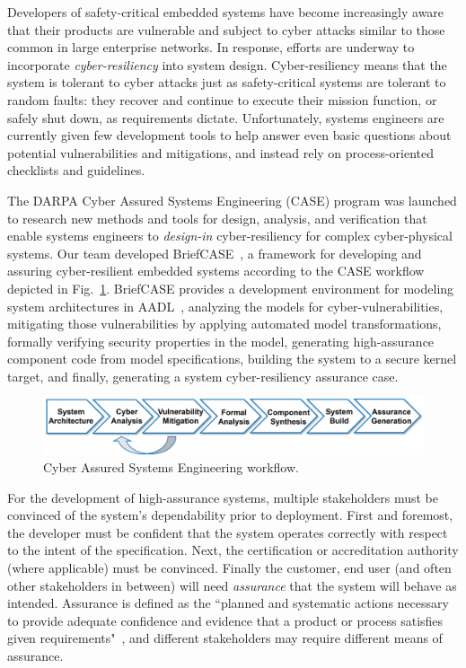 
Developers of safety-critical embedded systems have become increasingly aware that their products are vulnerable and subject to cyber attacks similar to those common in large enterprise networks.  In response, efforts are underway to incorporate \textit{cyber-resiliency} into system design.  Cyber-resiliency means that the system is tolerant to cyber attacks just as safety-critical systems are tolerant to random faults: they recover and continue to execute their mission function, or safely shut down, as requirements dictate.  Unfortunately, systems engineers are currently given few development tools to help answer even basic questions about potential vulnerabilities and mitigations, and instead rely on process-oriented checklists and guidelines.

The DARPA Cyber Assured Systems Engineering (CASE) program was launched to research new methods and tools for design, analysis, and verification that enable systems engineers to \textit{design-in} cyber-resiliency for complex cyber-physical systems. 
%
Our team developed BriefCASE~\cite{case-at-scale}, a framework for developing and assuring cyber-resilient embedded systems according to the CASE workflow depicted in Fig.~\ref{fig:workflow}. BriefCASE provides a development environment for modeling system architectures in AADL~\cite{feiler-aadl}, analyzing the models for cyber-vulnerabilities, mitigating those vulnerabilities by applying automated model transformations, formally verifying security properties in the model, generating high-assurance component code from model specifications, building the system to a secure kernel target, and finally, generating a system cyber-resiliency assurance case.  

\begin{figure}[h] 
	\centering 
	\includegraphics[width=\columnwidth]{figs/workflow.jpg}
	\caption{Cyber Assured Systems Engineering workflow.}
	\label{fig:workflow} 
\end{figure}

For the development of high-assurance systems, multiple stakeholders must be convinced of the system's dependability prior to deployment.  First and foremost, the developer must be confident that the system operates correctly with respect to the intent of the specification.  Next, the certification or accreditation authority (where applicable) must be convinced.  Finally the customer, end user (and often other stakeholders in between) will need \textit{assurance} that the system will behave as intended.  
Assurance is defined as the ``planned and systematic actions necessary to provide adequate confidence and evidence that a product or process satisfies given requirements"~\cite{do-178c}, and different stakeholders may require different means of assurance.  


